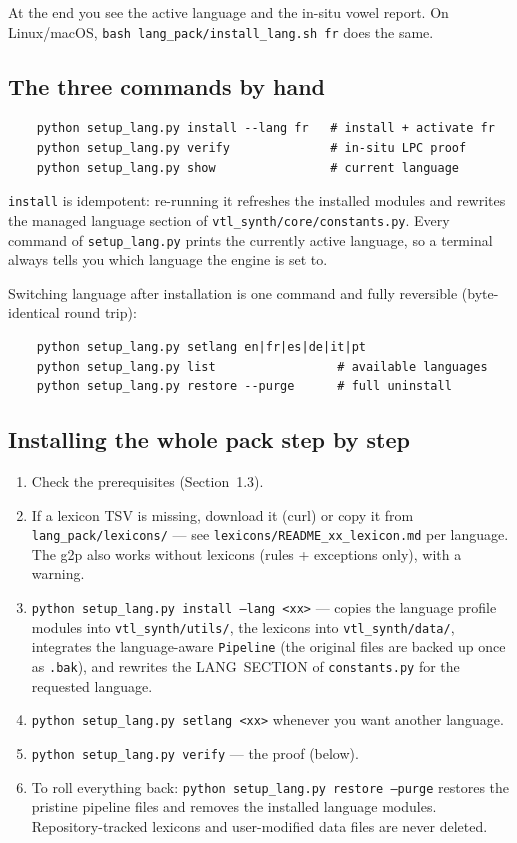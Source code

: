 \documentclass[11pt,a4paper]{article}
\newcommand{\code}[1]{\texttt{#1}}
\begin{document}
At the end you see the active language and the in-situ vowel report.
On Linux/macOS, \code{bash lang\_pack/install\_lang.sh fr} does the
same.

\subsection{The three commands by hand}

\begin{verbatim}
    python setup_lang.py install --lang fr   # install + activate fr
    python setup_lang.py verify              # in-situ LPC proof
    python setup_lang.py show                # current language
\end{verbatim}

\code{install} is idempotent: re-running it refreshes the installed
modules and rewrites the managed language section of
\code{vtl\_synth/core/constants.py}. Every command of
\code{setup\_lang.py} prints the currently active language, so a
terminal always tells you which language the engine is set to.

Switching language after installation is one command and fully
reversible (byte-identical round trip):

\begin{verbatim}
    python setup_lang.py setlang en|fr|es|de|it|pt
    python setup_lang.py list                 # available languages
    python setup_lang.py restore --purge      # full uninstall
\end{verbatim}

\subsection{Installing the whole pack step by step}

\begin{enumerate}
\item Check the prerequisites (Section~1.3).
\item If a lexicon TSV is missing, download it (curl) or copy it from
      \code{lang\_pack/lexicons/} --- see
      \code{lexicons/README\_xx\_lexicon.md} per language. The g2p
      also works without lexicons (rules + exceptions only), with a
      warning.
\item \code{python setup\_lang.py install --lang <xx>}
      --- copies the language profile modules into
      \code{vtl\_synth/utils/}, the lexicons into
      \code{vtl\_synth/data/}, integrates the language-aware
      \code{Pipeline} (the original files are backed up once as
      \code{.bak}), and rewrites the LANG~SECTION of
      \code{constants.py} for the requested language.
\item \code{python setup\_lang.py setlang <xx>} whenever you want
      another language.
\item \code{python setup\_lang.py verify} --- the proof (below).
\item To roll everything back:
      \code{python setup\_lang.py restore --purge} restores the
      pristine pipeline files and removes the installed language
      modules. Repository-tracked lexicons and user-modified data
      files are never deleted.
\end{enumerate}
\end{document}
